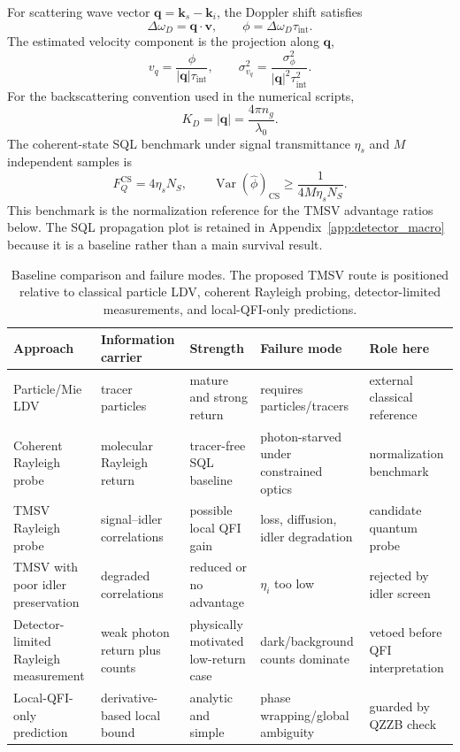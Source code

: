 \documentclass[a4paper,11pt]{article}
\numberwithin{equation}{section}
\newcommand{\Ns}{N_{S}}
\newcommand{\etas}{\eta_s}
\newcommand{\FCS}{F_Q^{\mathrm{CS}}}
\newcommand{\Var}{\operatorname{Var}}
\begin{document}
For scattering wave vector $\mathbf{q}=\mathbf{k}_s-\mathbf{k}_i$, the Doppler shift satisfies
\begin{equation}
  \Delta \omega_D=\mathbf{q}\cdot \mathbf{v},
  \qquad
  \phi=\Delta\omega_D\tau_{\mathrm{int}}.
\end{equation}
The estimated velocity component is the projection along $\mathbf{q}$,
\begin{equation}
  v_q=\frac{\phi}{|\mathbf{q}|\tau_{\mathrm{int}}},
  \qquad
  \sigma_{v_q}^2=\frac{\sigma_\phi^2}{|\mathbf{q}|^2\tau_{\mathrm{int}}^2}.
  \label{eq:phase_velocity}
\end{equation}
For the backscattering convention used in the numerical scripts,
\begin{equation}
  K_D=|\mathbf{q}|=\frac{4\pi n_g}{\lambda_0}.
\end{equation}
The coherent-state SQL benchmark under signal transmittance $\etas$ and $M$ independent samples is
\begin{equation}
  \FCS=4\etas\Ns,
  \qquad
  \Var(\hat\phi)_{\mathrm{CS}}\ge \frac{1}{4M\etas\Ns}.
  \label{eq:coherent_sql}
\end{equation}
This benchmark is the normalization reference for the TMSV advantage ratios below. The SQL propagation plot is retained in Appendix~\ref{app:detector_macro} because it is a baseline rather than a main survival result.

\begin{table}[htbp]
\centering
\caption{Baseline comparison and failure modes. The proposed TMSV route is positioned relative to classical particle LDV, coherent Rayleigh probing, detector-limited measurements, and local-QFI-only predictions.}
\label{tab:baseline_comparison}
\scriptsize
\begin{tabularx}{\textwidth}{p{}p{}p{}p{}X}
\toprule
Approach & Information carrier & Strength & Failure mode & Role here \\
\midrule
Particle/Mie LDV & tracer particles & mature and strong return & requires particles/tracers & external classical reference \\
Coherent Rayleigh probe & molecular Rayleigh return & tracer-free SQL baseline & photon-starved under constrained optics & normalization benchmark \\
TMSV Rayleigh probe & signal--idler correlations & possible local QFI gain & loss, diffusion, idler degradation & candidate quantum probe \\
TMSV with poor idler preservation & degraded correlations & reduced or no advantage & $\eta_i$ too low & rejected by idler screen \\
Detector-limited Rayleigh measurement & weak photon return plus counts & physically motivated low-return case & dark/background counts dominate & vetoed before QFI interpretation \\
Local-QFI-only prediction & derivative-based local bound & analytic and simple & phase wrapping/global ambiguity & guarded by QZZB check \\
\bottomrule
\end{tabularx}
\end{table}
\end{document}
